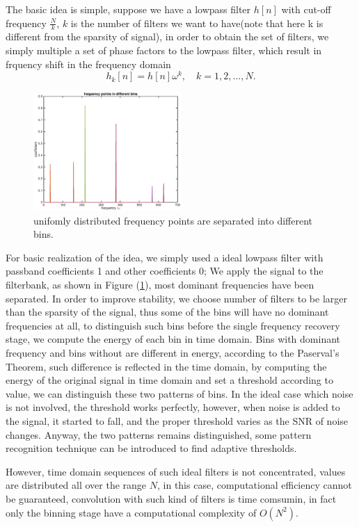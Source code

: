 \documentclass[journal,transmag]{IEEEtran}
\begin{document}
The basic idea is simple, suppose we have a lowpass filter $h[n]$ with cut-off frequency $\frac{N}{k}$, $k$ is the number of filters we want to have(note that here k is different from the sparsity of signal), in order to obtain the set of filters, we simply multiple a set of phase factors to the lowpass filter, which result in frquency shift in the frequency domain
\begin{equation}
h_k[n]=h[n]\omega^k, \quad k = 1,2,...,N.
\end{equation}
\begin{figure}[htbp]
	\includegraphics[width=0.5\textwidth]{bins}
	\caption{unifomly distributed frequency points are separated into different bins.}
	\label{bins}
\end{figure}
For basic realization of the idea, we simply used a ideal lowpass filter with passband coefficients 1 and other coefficients 0; We apply the signal to the filterbank, as shown in Figure (\ref{bins}), most dominant frequencies have been separated. In order to improve stability, we choose number of filters to be larger than the sparsity of the signal, thus some of the bins will have no dominant frequencies at all, to distinguish such bins before the single frequency recovery stage, we compute the energy of each bin in time domain. Bins with dominant frequency and bins without are different in energy, according to the Paserval's Theorem, such difference is reflected in the time domain, by computing the energy of the original signal in time domain and set a threshold according to value, we can distinguish these two patterns of bins. In the ideal case which noise is not involved, the threshold works perfectly, however, when noise is added to the signal, it started to fall, and the proper threshold varies as the SNR of noise changes. Anyway, the two patterns remains distinguished, some pattern recognition technique can be introduced to find  adaptive thresholds.

However, time domain sequences of such ideal filters is not concentrated, values are distributed all over the range $N$, in this case, computational efficiency cannot be guaranteed, convolution with such kind of filters is time comsumin, in fact only the binning stage have a computational complexity of $O(N^2)$.
\end{document}
